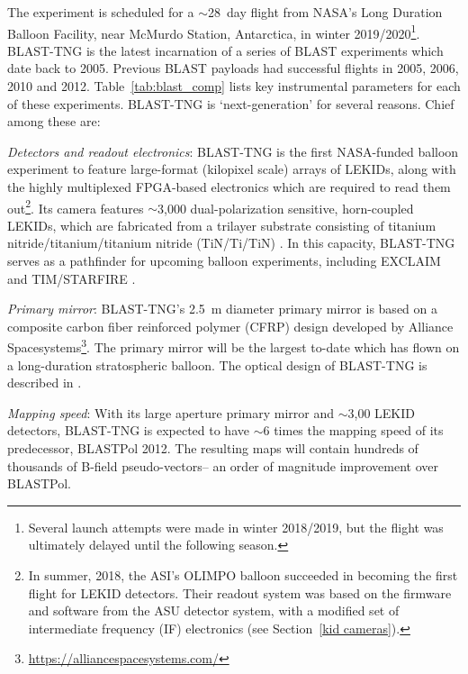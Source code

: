 The experiment is scheduled for a $\sim$28~day flight from NASA's Long Duration Balloon Facility, near McMurdo Station, Antarctica, in winter 2019/2020\footnote{Several launch attempts were made in winter 2018/2019, but the flight was ultimately delayed until the following season.}. BLAST-TNG is the latest incarnation of a series of BLAST experiments which date back to 2005. Previous BLAST payloads had successful flights in 2005, 2006, 2010 and 2012. Table~\ref{tab:blast_comp} lists key instrumental parameters for each of these experiments. BLAST-TNG is `next-generation' for several reasons. Chief among these are:

\vspace{5mm}

\textit{Detectors and readout electronics}: BLAST-TNG is the first NASA-funded balloon experiment to feature large-format (kilopixel scale) arrays of LEKIDs, along with the highly multiplexed FPGA-based electronics which are required to read them out\footnote{In summer, 2018, the ASI's OLIMPO balloon succeeded in becoming the first flight for LEKID detectors. Their readout system was based on the firmware and software from the ASU detector system, with a modified set of intermediate frequency (IF) electronics (see Section~\ref{kid cameras}).}. Its camera features $\sim$3,000 dual-polarization sensitive, horn-coupled LEKIDs, which are fabricated from a trilayer substrate consisting of titanium nitride/titanium/titanium nitride (TiN/Ti/TiN) \citep{hubmayr2014dual}. In this capacity, BLAST-TNG serves as a pathfinder for upcoming balloon experiments, including EXCLAIM \citep{switzer2017measuring} and TIM/STARFIRE \citep{aguirre2018starfire}.

\vspace{5mm}

\textit{Primary mirror}: BLAST-TNG's 2.5~m diameter primary mirror is based on a composite carbon fiber reinforced polymer (CFRP) design developed by Alliance Spacesystems\footnote{\url{https://alliancespacesystems.com/}}. The primary mirror will be the largest to-date which has flown on a long-duration stratospheric balloon. The optical design of BLAST-TNG is described in \citet{lourie2018design}.

\vspace{5mm}

\textit{Mapping speed}: With its large aperture primary mirror and $\sim$3,00 LEKID detectors, BLAST-TNG is expected to have $\sim$6 times the mapping speed of its predecessor, BLASTPol 2012. The resulting maps will contain hundreds of thousands of B-field pseudo-vectors-- an order of magnitude improvement over BLASTPol.

